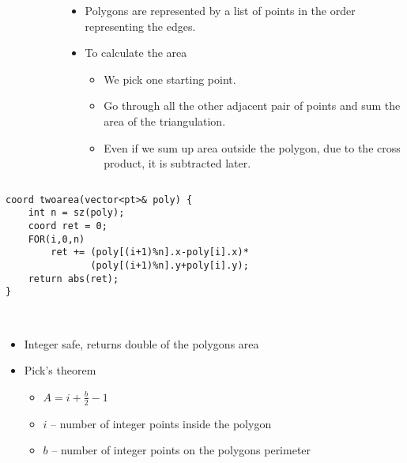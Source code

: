 \documentclass[12pt,t]{beamer}
\newcommand{\bi}{\begin{itemize}}
\newcommand{\ei}{\end{itemize}}
\begin{document}
\begin{frame}
\begin{columns}
\begin{column}{0.4\textwidth}
\begin{figure}
      \end{figure}
    \end{column}
    \begin{column}{0.6\textwidth}
      \bi
        \item Polygons are represented by a list of points in the order
          representing the edges.
        \item To calculate the area
          \bi
            \item We pick one starting point.
            \item Go through all the other adjacent pair of points and sum the
              area of the triangulation.
            \item Even if we sum up area outside the polygon, due to the cross
              product, it is subtracted later.
          \ei
      \ei
    \end{column}
  \end{columns}
\end{frame}

\begin{frame}[fragile]
  \vspace{20pt}
  \footnotesize
  \begin{verbatim}
coord twoarea(vector<pt>& poly) {
    int n = sz(poly);
    coord ret = 0;
    FOR(i,0,n)
        ret += (poly[(i+1)%n].x-poly[i].x)*
               (poly[(i+1)%n].y+poly[i].y);
    return abs(ret);
}
  \end{verbatim} 
  \ \\ \pause
  \bi
  	\item Integer safe, returns double of the polygons area 
  	\item Pick's theorem
  	\bi
  		\item $A = i + \frac{b}{2}-1$
  		\item $i$ -- number of integer points inside the polygon
  		\item $b$ -- number of integer points on the polygons perimeter
  	\ei
  \ei
\end{frame}
\end{document}
